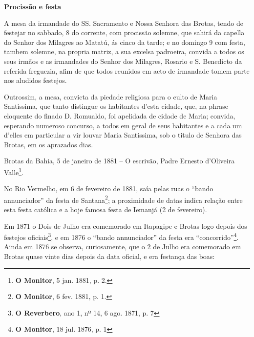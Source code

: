 \begin{citacao}
\textbf{Procissão e festa}

A mesa da irmandade do SS. Sacramento e Nossa Senhora das Brotas, tendo de festejar no sabbado, 8 do corrente, com procissão solemne, que sahirá da capella do Senhor dos Milagres ao Matatú, ás cinco da tarde; e no domingo 9 com festa, tambem solemne, na propria matriz, a sua excelsa padroeira, convida a todos os seus irmãos e as irmandades do Senhor dos Milagres, Rosario e S. Benedicto da referida freguezia, afim de que todos reunidos em acto de irmandade tomem parte nos aludidos festejos.

Outrossim, a mesa, convicta da piedade religiosa para o culto de Maria Santissima, que tanto distingue os habitantes d'esta cidade, que, na phrase eloquente do finado D. Romualdo, foi apelidada de cidade de Maria; convida, esperando numeroso concurso, a todos em geral de seus habitantes e a cada um d'elles em particular a vir louvar Maria Santissima, sob o titulo de Senhora das Brotas, em os aprazados dias.

Brotas da Bahia, 5 de janeiro de 1881 -- O escrivão, Padre Ernesto d'Oliveira Valle\footnote{\textbf{O Monitor}, 5 jan. 1881, p. 2.}.
\end{citacao}

No Rio Vermelho, em 6 de fevereiro de 1881, saía pelas ruas o ``bando annunciador'' da festa de Santana\footnote{\textbf{O Monitor}, 6 fev. 1881, p. 1.}; a proximidade de datas indica relação entre esta festa católica e a hoje famosa festa de Iemanjá (2 de fevereiro).

Em 1871 o Dois de Julho era comemorado em Itapagipe e Brotas logo depois dos festejos oficiais\footnote{\textbf{O Reverbero}, ano 1, nº 14, 6 ago. 1871, p. 7}, e em 1876 o ``bando annunciador'' da festa era ``concorrido''\footnote{\textbf{O Monitor}, 18 jul. 1876, p. 1}. Ainda em 1876 se observa, curiosamente, que o 2 de Julho era comemorado em Brotas quase vinte dias depois da data oficial, e era festança das boas:

